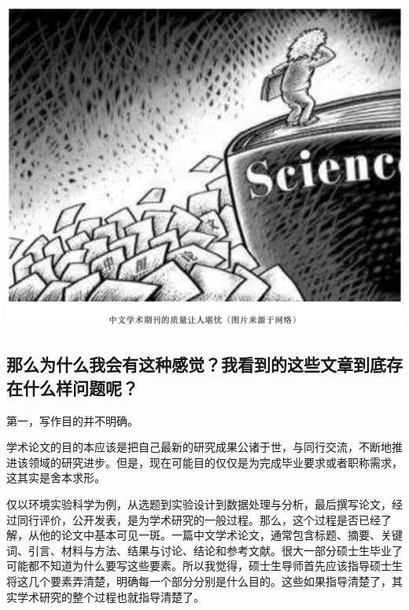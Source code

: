 \documentclass[]{book}
\begin{document}
\includegraphics[width=8.33in]{images/edit1}

\hypertarget{ux90a3ux4e48ux4e3aux4ec0ux4e48ux6211ux4f1aux6709ux8fd9ux79cdux611fux89c9ux6211ux770bux5230ux7684ux8fd9ux4e9bux6587ux7ae0ux5230ux5e95ux5b58ux5728ux4ec0ux4e48ux6837ux95eeux9898ux5462}{%
\subsection{那么为什么我会有这种感觉？我看到的这些文章到底存在什么样问题呢？}\label{ux90a3ux4e48ux4e3aux4ec0ux4e48ux6211ux4f1aux6709ux8fd9ux79cdux611fux89c9ux6211ux770bux5230ux7684ux8fd9ux4e9bux6587ux7ae0ux5230ux5e95ux5b58ux5728ux4ec0ux4e48ux6837ux95eeux9898ux5462}}

第一，写作目的并不明确。

学术论文的目的本应该是把自己最新的研究成果公诸于世，与同行交流，不断地推进该领域的研究进步。但是，现在可能目的仅仅是为完成毕业要求或者职称需求，这其实是舍本求形。

仅以环境实验科学为例，从选题到实验设计到数据处理与分析，最后撰写论文，经过同行评价，公开发表，是为学术研究的一般过程。那么，这个过程是否已经了解，从他的论文中基本可见一斑。一篇中文学术论文，通常包含标题、摘要、关键词、引言、材料与方法、结果与讨论、结论和参考文献。很大一部分硕士生毕业了可能都不知道为什么要写这些要素。所以我觉得，硕士生导师首先应该指导硕士生将这几个要素弄清楚，明确每一个部分分别是什么目的。这些如果指导清楚了，其实学术研究的整个过程也就指导清楚了。
\end{document}
